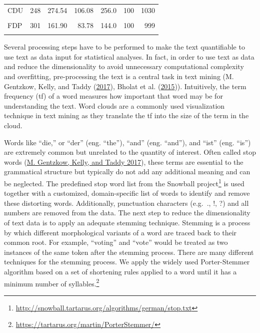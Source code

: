 \documentclass[
  12pt,
]{article}
\begin{document}
\begin{table}[H]
\begin{tabular}[t]{lrrrrrr}
\hspace{1em}CDU & 248 & 274.54 & 106.08 & 256.0 & 100 & 1030\\
\hspace{1em}\cellcolor{gray!6}{DIE LINKE} & \cellcolor{gray!6}{686} & \cellcolor{gray!6}{200.47} & \cellcolor{gray!6}{71.78} & \cellcolor{gray!6}{190.0} & \cellcolor{gray!6}{101} & \cellcolor{gray!6}{1048}\\
\hspace{1em}FDP & 301 & 161.90 & 83.78 & 144.0 & 100 & 999\\
\hspace{1em}\cellcolor{gray!6}{SPD} & \cellcolor{gray!6}{315} & \cellcolor{gray!6}{213.41} & \cellcolor{gray!6}{56.16} & \cellcolor{gray!6}{208.0} & \cellcolor{gray!6}{103} & \cellcolor{gray!6}{429}\\
\bottomrule
\end{tabular}
\end{table}

Several processing steps have to be performed to make the text
quantifiable to use text as data input for statistical analyses. In
fact, in order to use text as data and reduce the dimensionality to
avoid unnecessary computational complexity and overfitting,
pre-processing the text is a central task in text mining (M. Gentzkow,
Kelly, and Taddy (\protect\hyperlink{ref-gentzkow_text_2017}{2017}),
Bholat et al. (\protect\hyperlink{ref-bholat_text_2015}{2015})).
Intuitively, the term frequency (tf) of a word measures how important
that word may be for understanding the text. Word clouds are a commonly
used visualization technique in text mining as they translate the tf
into the size of the term in the cloud.

Words like ``die,'' or ``der'' (eng. ``the''), ``and'' (eng. ``and''),
and ``ist'' (eng. ``is'') are extremely common but unrelated to the
quantity of interest. Often called stop words
(\protect\hyperlink{ref-gentzkow_text_2017}{M. Gentzkow, Kelly, and
Taddy 2017}), these terms are essential to the grammatical structure but
typically do not add any additional meaning and can be neglected. The
predefined stop word list from the Snowball project\footnote{\url{http://snowball.tartarus.org/algorithms/german/stop.txt}}
is used together with a customized, domain-specific list of words to
identify and remove these distorting words. Additionally, punctuation
characters (e.g.~., !, ?) and all numbers are removed from the data. The
next step to reduce the dimensionality of text data is to apply an
adequate stemming technique. Stemming is a process by which different
morphological variants of a word are traced back to their common root.
For example, ``voting'' and ``vote'' would be treated as two instances
of the same token after the stemming process. There are many different
techniques for the stemming process. We apply the widely used
Porter-Stemmer algorithm based on a set of shortening rules applied to a
word until it has a minimum number of syllables.\footnote{\url{https://tartarus.org/martin/PorterStemmer/}}
\end{document}
